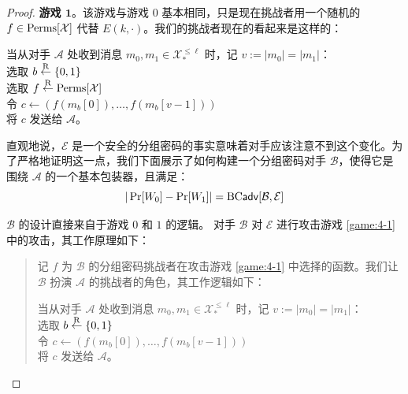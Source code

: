 \begin{proof}
\noindent
\textbf{游戏 $\mathbf{1}$}。该游戏与游戏 $0$ 基本相同，只是现在挑战者用一个随机的 $f\in{\rm Perms}[\mathcal{X}]$ 代替 $E(k,\cdot)$。我们的挑战者现在的看起来是这样的：

\vspace*{5pt}

\hspace*{5pt} 当从对手 $\mathcal{A}$ 处收到消息 $m_0,m_1\in\mathcal{X}_*^{\leq\ell}$ 时，记 $v:=|m_0|=|m_1|$：\\
\hspace*{50pt} 选取 $b\overset{\rm R}\leftarrow\{0,1\}$\\
\hspace*{50pt} 选取 $f\overset{\rm R}\leftarrow{\rm Perms}[\mathcal{X}]$\\
\hspace*{50pt} 令 $c\leftarrow(f(m_b[0]),\dots,f(m_b[v-1]))$\\
\hspace*{50pt} 将 $c$ 发送给 $\mathcal{A}$。

\vspace*{5pt}

直观地说，$\mathcal{E}$ 是一个安全的分组密码的事实意味着对手应该注意不到这个变化。为了严格地证明这一点，我们下面展示了如何构建一个分组密码对手 $\mathcal{B}$，使得它是围绕 $\mathcal{A}$ 的一个基本包装器，且满足：
\begin{equation}\label{eq:4-6}
|\Pr[W_0]-\Pr[W_1]|={\rm BC\mathsf{adv}}[\mathcal{B},\mathcal{E}]
\end{equation}

$\mathcal{B}$ 的设计直接来自于游戏 $0$ 和 $1$ 的逻辑。 对手 $\mathcal{B}$ 对 $\mathcal{E}$ 进行攻击游戏 \ref{game:4-1} 中的攻击，其工作原理如下：
\begin{quote}
记 $f$ 为 $\mathcal{B}$ 的分组密码挑战者在攻击游戏 \ref{game:4-1} 中选择的函数。我们让 $\mathcal{B}$ 扮演 $\mathcal{A}$ 的挑战者的角色，其工作逻辑如下：

\vspace*{5pt}

\hspace*{20pt} 当从对手 $\mathcal{A}$ 处收到消息 $m_0,m_1\in\mathcal{X}_*^{\leq\ell}$ 时，记 $v:=|m_0|=|m_1|$：\\
\hspace*{50pt} 选取 $b\overset{\rm R}\leftarrow\{0,1\}$\\
\hspace*{50pt} 令 $c\leftarrow(f(m_b[0]),\dots,f(m_b[v-1]))$\\
\hspace*{50pt} 将 $c$ 发送给 $\mathcal{A}$。


\end{quote}
\end{proof}

